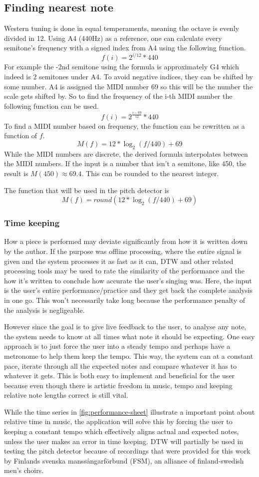 \subsection{Finding nearest note}
Western tuning is done in equal temperaments, meaning the octave is evenly divided in 12. Using A4 (440Hz) as a reference, one can calculate every semitone's frequency with a signed index from A4 using the following function. 
$$f(i) = 2^{i/12}*440$$
For example the -2nd semitone using the formula is approximately G4 which indeed is 2 semitones under A4. To avoid negative indices, they can be shifted by some number. A4 is assigned the MIDI number 69 so this will be the number the scale gets shifted by. So to find the frequency of the i-th MIDI number the following function can be used.
$$f(i) = 2^{\frac{i-69}{12}}*440$$
To find a MIDI number based on frequency, the function can be rewritten as a function of $f$.
$$M(f) = 12*\log_2(f/440)+69$$
While the MIDI numbers are discrete, the derived formula interpolates between the MIDI numbers. If the input is a number that isn't a semitone, like 450, the result is $M(450) \approx 69.4$. This can be rounded to the nearest integer.

The function that will be used in the pitch detector is
$$M(f) = round(12*\log_2(f/440)+69)$$

\subsubsection{Time keeping}
How a piece is performed may deviate significantly from how it is written down by the author. If the purpose was offline processing, where the entire signal is given and the system processes it as fast as it can, DTW and other related processing tools may be used to rate the similarity of the performance and the how it's written to conclude how accurate the user's singing was. Here, the input is the user's entire performance/practice and they get back the complete analysis in one go. This won't necessarily take long because the performance penalty of the analysis is negligeable.

However since the goal is to give live feedback to the user, to analyse any note, the system needs to know at all times what note it should be expecting. One easy approach is to just force the user into a steady tempo and perhaps have a metronome to help them keep the tempo. This way, the system can at a constant pace, iterate through all the expected notes and compare whatever it has to whatever it gets. This is both easy to implement and beneficial for the user because even though there is artistic freedom in music, tempo and keeping relative note lengths correct is still vital. 

While the time series in \ref{fig:performance-sheet} illustrate a important point about relative time in music, the application will solve this by forcing the user to keeping a constant tempo which effectively aligns actual and expected notes, unless the user makes an error in time keeping. DTW will partially be used in testing the pitch detector because of recordings that were provided for this work by Finlands svenska manssångarförbund (FSM), an alliance of finland-swedish men's choirs. 
